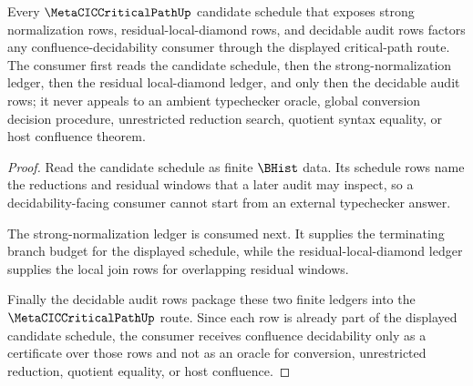 \begin{theorem}
\label{thm:metacic-critical-path-candidate-confluence-decidable-reflection}
Every $\MetaCICCriticalPathUp$ candidate schedule that exposes strong normalization rows, residual-local-diamond rows, and decidable audit rows factors any confluence-decidability consumer through the displayed critical-path route. The consumer first reads the candidate schedule, then the strong-normalization ledger, then the residual local-diamond ledger, and only then the decidable audit rows; it never appeals to an ambient typechecker oracle, global conversion decision procedure, unrestricted reduction search, quotient syntax equality, or host confluence theorem.
\end{theorem}
\begin{proof}
Read the candidate schedule as finite $\BHist$ data. Its schedule rows name the reductions and residual windows that a later audit may inspect, so a decidability-facing consumer cannot start from an external typechecker answer.

The strong-normalization ledger is consumed next. It supplies the terminating branch budget for the displayed schedule, while the residual-local-diamond ledger supplies the local join rows for overlapping residual windows.

Finally the decidable audit rows package these two finite ledgers into the $\MetaCICCriticalPathUp$ route. Since each row is already part of the displayed candidate schedule, the consumer receives confluence decidability only as a certificate over those rows and not as an oracle for conversion, unrestricted reduction, quotient equality, or host confluence.
\end{proof}
